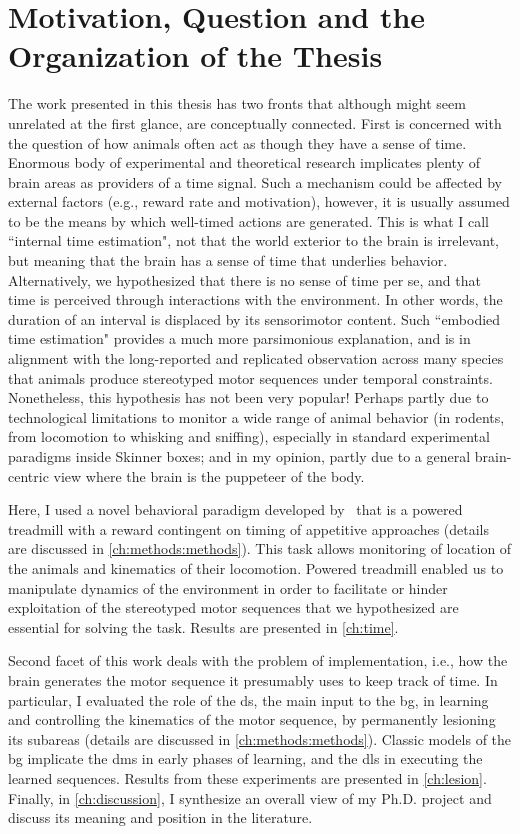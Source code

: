 \section[Motivation, Question and More]{Motivation, Question and the Organization of the Thesis}
\label{intro:question}

The work presented in this thesis has two fronts that although might seem unrelated at the first glance, are conceptually connected.
First is concerned with the question of how animals often act as though they have a sense of time.
Enormous body of experimental and theoretical research implicates plenty of brain areas as providers of a time signal.
Such a mechanism could be affected by external factors (e.g., reward rate and motivation), however, it is usually assumed to be the means by which well-timed actions are generated.
This is what I call ``internal time estimation", not that the world exterior to the brain is irrelevant, but meaning that the brain has a sense of time that underlies behavior.
Alternatively, we hypothesized that there is no sense of time per se, and that time is perceived through interactions with the environment.
In other words, the duration of an interval is displaced by its sensorimotor content.
Such ``embodied time estimation" provides a much more parsimonious explanation, and is in alignment with the long-reported and replicated observation across many species that animals produce stereotyped motor sequences under temporal constraints.
Nonetheless, this hypothesis has not been very popular!
Perhaps partly due to technological limitations to monitor a wide range of animal behavior (in rodents, from locomotion to whisking and sniffing), especially in standard experimental paradigms inside Skinner boxes; and in my opinion, partly due to a general brain-centric view where the brain is the puppeteer of the body.
\par
Here, I used a novel behavioral paradigm developed by~\citeauthor{Rueda2015NN} that is a powered treadmill with a reward contingent on timing of appetitive approaches (details are discussed in \autoref{ch:methods:methods}).
This task allows monitoring of location of the animals and kinematics of their locomotion.
Powered treadmill enabled us to manipulate dynamics of the environment in order to facilitate or hinder exploitation of the stereotyped motor sequences that we hypothesized are essential for solving the task.
Results are presented in \autoref{ch:time}.
\par
Second facet of this work deals with the problem of implementation, i.e., how the brain generates the motor sequence it presumably uses to keep track of time.
In particular, I evaluated the role of the \gls{ds}, the main input to the \gls{bg}, in learning and controlling the kinematics of the motor sequence, by permanently lesioning its subareas (details are discussed in \autoref{ch:methods:methods}).
Classic models of the \gls{bg} implicate the \gls{dms} in early phases of learning, and the \gls{dls} in executing the learned sequences.
Results from these experiments are presented in \autoref{ch:lesion}.
Finally, in \autoref{ch:discussion}, I synthesize an overall view of my Ph.D. project and discuss its meaning and position in the literature.